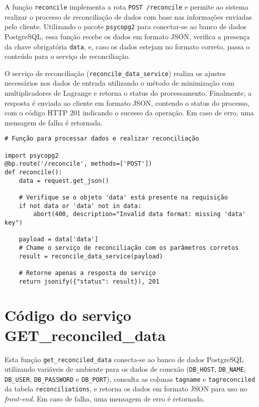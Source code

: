 A função \texttt{reconcile} implementa a rota \texttt{POST /reconcile} e permite ao sistema realizar o processo de reconciliação de dados com base nas informações enviadas pelo cliente. Utilizando o pacote \texttt{psycopg2} para conectar-se ao banco de dados PostgreSQL, essa função recebe os dados em formato JSON, verifica a presença da chave obrigatória \texttt{data}, e, caso os dados estejam no formato correto, passa o conteúdo para o serviço de reconciliação.

O serviço de reconciliação (\texttt{reconcile\_data\_service}) realiza os ajustes necessários nos dados de entrada utilizando o método de minimização com multiplicadores de Lagrange e retorna o status do processamento. Finalmente, a resposta é enviada ao cliente em formato JSON, contendo o status do processo, com o código HTTP 201 indicando o sucesso da operação. Em caso de erro, uma mensagem de falha é retornada.

\begin{verbatim}
# Função para processar dados e realizar reconciliação

import psycopg2
@bp.route('/reconcile', methods=['POST'])
def reconcile():
    data = request.get_json()

    # Verifique se o objeto 'data' está presente na requisição
    if not data or 'data' not in data:
        abort(400, description="Invalid data format: missing 'data' key")

    payload = data['data']
    # Chame o serviço de reconciliação com os parâmetros corretos
    result = reconcile_data_service(payload)

    # Retorne apenas a resposta do serviço
    return jsonify({"status": result}), 201
\end{verbatim}

\chapter{Código do serviço GET\_reconciled\_data}
\label{Anexo:CodigoFunctionGetReconciledData}

Esta função \texttt{get\_reconciled\_data} conecta-se ao banco de dados PostgreSQL utilizando variáveis de ambiente para os dados de conexão (\texttt{DB\_HOST}, \texttt{DB\_NAME}, \texttt{DB\_USER}, \texttt{DB\_PASSWORD} e \texttt{DB\_PORT}), consulta as colunas \texttt{tagname} e \texttt{tagreconciled} da tabela \texttt{reconciliations}, e retorna os dados em formato JSON para uso no \textit{front-end}. Em caso de falha, uma mensagem de erro é retornada.

